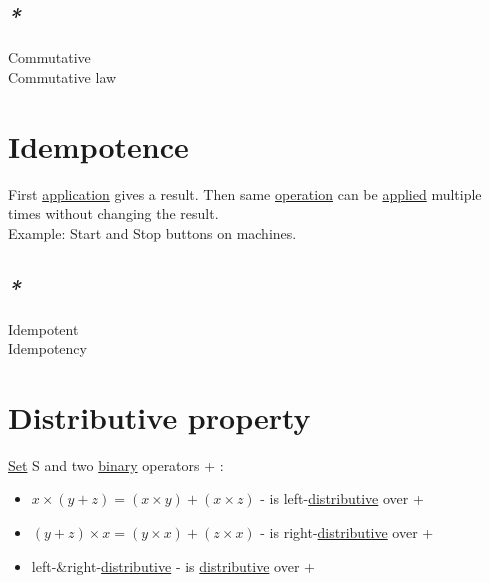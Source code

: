 \documentclass[a4paper,14pt,oneside]{book}
\begin{document}
\subsection{\emph{*}}
\label{sec:orge5e0b31}

\label{orga3b086e}Commutative\\
\label{orgbc7e577}Commutative law\\

\section{\label{org4b0d560}Idempotence}
\label{sec:org0a928f4}
First \hyperref[org5c027e8]{application} gives a result. Then same \hyperref[org6ed0c27]{operation} can be \hyperref[orgddce002]{applied} multiple times without changing the result.\\
Example: Start and Stop buttons on machines.\\

\subsection{\emph{*}}
\label{sec:org01165c8}

\label{orged62e75}Idempotent\\
\label{org6d81ecf}Idempotency\\

\section{\label{org07e200d}Distributive property}
\label{sec:org7a87068}
\hyperref[orge119629]{Set} S and two \hyperref[orgd0575cd]{binary} operators + \texttimes{}:\\

\begin{itemize}
\item \(x \times (y + z) = (x \times y) + (x \times z)\) - \texttimes{} is left-\hyperref[orgdfa9db4]{distributive} over +\\
\item \((y + z) \times x = (y \times x) + (z \times x)\) - \texttimes{} is right-\hyperref[orgdfa9db4]{distributive} over +\\
\item left-\&right-\hyperref[orgdfa9db4]{distributive} - \texttimes{} is \hyperref[orgdfa9db4]{distributive} over +\\
\end{itemize}
\end{document}
